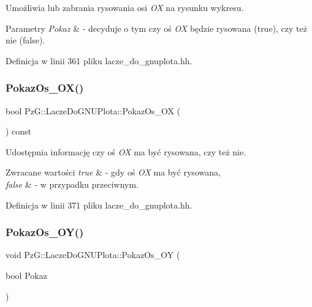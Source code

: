 Umożliwia lub zabrania rysowania osi {\itshape OX} na rysunku wykresu. 
\begin{DoxyParams}{Parametry}
{\em Pokaz} & -\/ decyduje o tym czy oś {\itshape OX} będzie rysowana ({\ttfamily true}), czy też nie ({\ttfamily false}). \\
\hline
\end{DoxyParams}


Definicja w linii 361 pliku lacze\+\_\+do\+\_\+gnuplota.\+hh.

\mbox{\label{class_pz_g_1_1_lacze_do_g_n_u_plota_ae112972af57167c3b053bf922bce6bbf}} 
\subsubsection{\texorpdfstring{PokazOs\_OX()}{PokazOs\_OX()}\hspace{0.1cm}{\footnotesize\ttfamily [2/2]}}
{\footnotesize\ttfamily bool Pz\+G\+::\+Lacze\+Do\+G\+N\+U\+Plota\+::\+Pokaz\+Os\+\_\+\+OX (\begin{DoxyParamCaption}{ }\end{DoxyParamCaption}) const\hspace{0.3cm}{\ttfamily [inline]}}

Udostępnia informację czy oś {\itshape OX} ma być rysowana, czy też nie. 
\begin{DoxyRetVals}{Zwracane wartości}
{\em true} & -\/ gdy oś {\itshape OX} ma być rysowana, \\
\hline
{\em false} & -\/ w przypadku przeciwnym. \\
\hline
\end{DoxyRetVals}


Definicja w linii 371 pliku lacze\+\_\+do\+\_\+gnuplota.\+hh.

\mbox{\label{class_pz_g_1_1_lacze_do_g_n_u_plota_a7c3db909b266fc30808e86406c04b516}} 
\subsubsection{\texorpdfstring{PokazOs\_OY()}{PokazOs\_OY()}\hspace{0.1cm}{\footnotesize\ttfamily [1/2]}}
{\footnotesize\ttfamily void Pz\+G\+::\+Lacze\+Do\+G\+N\+U\+Plota\+::\+Pokaz\+Os\+\_\+\+OY (\begin{DoxyParamCaption}\item[{bool}]{Pokaz }\end{DoxyParamCaption})\hspace{0.3cm}{\ttfamily [inline]}}

